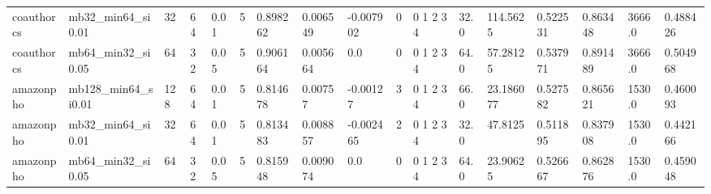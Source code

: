 \begin{table}[t]
\begin{tabular}{lllllllllllllllll}
coauthorcs & mb32_min64_si0.01 & 32 & 64 & 0.01 & 5 & 0.898262 & 0.006549 & -0.007902 & 0 & 0 1 2 3 4 & 32.0 & 114.5625 & 0.522531 & 0.863448 & 3666.0 & 0.488426 \\
coauthorcs & mb64_min32_si0.05 & 64 & 32 & 0.05 & 5 & 0.906164 & 0.005664 & 0.0 & 0 & 0 1 2 3 4 & 64.0 & 57.28125 & 0.537971 & 0.891489 & 3666.0 & 0.504968 \\
amazonpho & mb128_min64_si0.01 & 128 & 64 & 0.01 & 5 & 0.814678 & 0.00757 & -0.00127 & 3 & 0 1 2 3 4 & 66.0 & 23.186077 & 0.527582 & 0.865621 & 1530.0 & 0.460093 \\
amazonpho & mb32_min64_si0.01 & 32 & 64 & 0.01 & 5 & 0.813483 & 0.008857 & -0.002465 & 2 & 0 1 2 3 4 & 32.0 & 47.8125 & 0.511895 & 0.837908 & 1530.0 & 0.442166 \\
amazonpho & mb64_min32_si0.05 & 64 & 32 & 0.05 & 5 & 0.815948 & 0.009074 & 0.0 & 0 & 0 1 2 3 4 & 64.0 & 23.90625 & 0.526667 & 0.862876 & 1530.0 & 0.459048 \\
\bottomrule
\end{tabular}
\end{table}
